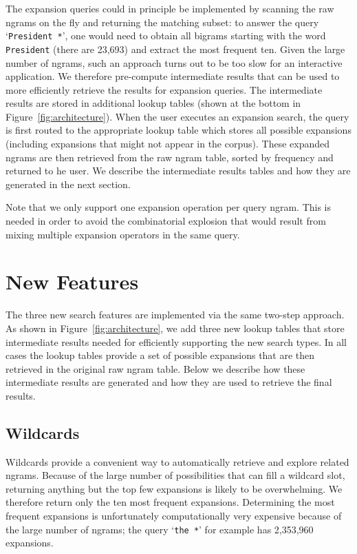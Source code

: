 \documentclass[11pt,a4paper]{article}
\newcommand{\query}[1]{\texttt{#1}}
\begin{document}
The expansion queries could in principle be implemented by scanning the raw ngrams on the fly and returning the matching subset: to answer the query `\query{President *}', one would need to obtain all bigrams starting with the word \query{President} (there are 23,693) and extract the most frequent ten. Given the large number of ngrams, such an approach turns out to be too slow for an interactive application. We therefore pre-compute intermediate results that can be used to more efficiently retrieve the results for expansion queries. The intermediate results are stored in additional lookup tables (shown at the bottom in Figure~\ref{fig:architecture}). When the user executes an expansion search, the query is first routed to the appropriate lookup table which stores all possible expansions (including expansions that might not appear in the corpus).  These expanded ngrams are then retrieved from the raw ngram table, sorted by frequency and returned to he user.
We describe the intermediate results tables and how they are generated in the next section.

Note that we only support one expansion operation per query ngram. This is needed in order to avoid the combinatorial explosion that would result from mixing multiple expansion operators in the same query.


\section{New Features}
\label{sec:features}
The three new search features are implemented via the same two-step approach. As shown in Figure~\ref{fig:architecture}, we add three new lookup tables that store intermediate results needed for efficiently supporting the new search types. In all cases the lookup tables provide a set of possible expansions that are then retrieved in the original raw ngram table. Below we describe how these intermediate results are generated and how they are used to retrieve the final results.

\subsection{Wildcards}
\label{sec:wildcards}
	Wildcards provide a convenient way to automatically retrieve and explore related ngrams. Because of the large number of possibilities that can fill a wildcard slot, returning anything but the top few expansions is likely to be overwhelming. We therefore return only the ten most frequent expansions. Determining the most frequent expansions is unfortunately computationally very expensive because of the large number of ngrams; the query `\query{the *}' for example has 2,353,960 expansions.
\end{document}
